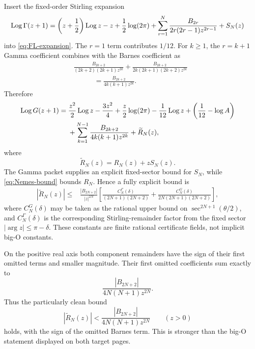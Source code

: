 Insert the fixed-order Stirling expansion
\begin{equation}\label{eq:stirling-gamma-use}
 \operatorname{Log}\Gamma(z+1)=
 \left(z+\frac12\right)\operatorname{Log} z-z+\frac12\log(2\pi)
 +\sum_{r=1}^{N}\frac{B_{2r}}{2r(2r-1)z^{2r-1}}
 +S_N(z)
\end{equation}
into \cref{eq:FL-expansion}.  The \(r=1\) term contributes \(1/12\).  For
\(k\ge1\), the \(r=k+1\) Gamma coefficient combines with the Barnes coefficient
as
\begin{align*}
 &\frac{B_{2k+2}}{(2k+2)(2k+1)z^{2k}}
 +\frac{B_{2k+2}}{2k(2k+1)(2k+2)z^{2k}}\\
 &\hspace{3em}=\frac{B_{2k+2}}{4k(k+1)z^{2k}}.
\end{align*}
Therefore
\begin{align}
 \operatorname{Log} G(z+1)={}&
 \frac{z^2}{2}\operatorname{Log} z-\frac{3z^2}{4}
 +\frac z2\log(2\pi)-\frac1{12}\operatorname{Log} z
 +\left(\frac1{12}-\log A\right)\notag\\
 &+\sum_{k=1}^{N-1}
 \frac{B_{2k+2}}{4k(k+1)z^{2k}}
 +\widetilde R_N(z),
 \label{eq:Barnes-asymptotic}
\end{align}
where
\begin{equation}\label{eq:combined-remainder}
 \widetilde R_N(z)=R_N(z)+zS_N(z).
\end{equation}
The Gamma packet supplies an explicit fixed-sector bound for \(S_N\), while
\cref{eq:Nemes-bound} bounds \(R_N\).  Hence a fully explicit bound is
\begin{align}
 |\widetilde R_N(z)|\le{}&
 \frac{|B_{2N+2}|}{|z|^{2N}}
 \left[
 \frac{C_N^{\Gamma}(\delta)}{(2N+1)(2N+2)}
 +\frac{C_N^G(\delta)}{2N(2N+1)(2N+2)}
 \right],
 \label{eq:combined-bound}
\end{align}
where \(C_N^G(\delta)\) may be taken as the rational upper bound on
\(\sec^{2N+1}(\theta/2)\), and \(C_N^\Gamma(\delta)\) is the corresponding
Stirling-remainder factor from the fixed sector
\(|\arg z|\le\pi-\delta\).  These constants are finite rational certificate
fields, not implicit big-O constants.

On the positive real axis both component remainders have the sign of their
first omitted terms and smaller magnitude.  Their first omitted coefficients
sum exactly to
\[
 \frac{|B_{2N+2}|}{4N(N+1)z^{2N}}.
\]
Thus the particularly clean bound
\begin{equation}\label{eq:positive-Barnes-bound}
 |\widetilde R_N(z)|
 <\frac{|B_{2N+2}|}{4N(N+1)z^{2N}}
 \qquad(z>0)
\end{equation}
holds, with the sign of the omitted Barnes term.  This is stronger than the
big-O statement displayed on both target pages.


